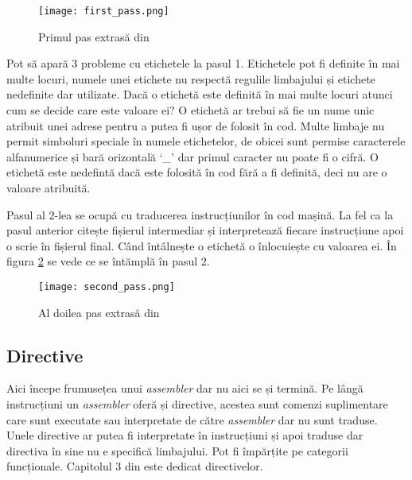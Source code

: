 \documentclass[../main.tex]{subfiles}
\begin{document}
\begin{figure}[h]
    \centering
    \texttt{[image: first\_pass.png]}
    \caption{Primul pas extrasă din \cite{cache}}
    \label{fig:first_pass}
\end{figure}

Pot să apară 3 probleme cu etichetele la pasul 1. Etichetele pot fi definite în mai multe locuri, numele unei etichete
nu respectă regulile limbajului și etichete nedefinite dar utilizate. Dacă o etichetă este definită în mai multe locuri
atunci cum se decide care este valoare ei? O etichetă ar trebui să fie un nume unic atribuit unei adrese pentru a putea
fi ușor de folosit în cod. Multe limbaje nu permit simboluri speciale în numele etichetelor, de obicei sunt permise
caracterele alfanumerice și bară orizontală `\_' dar primul caracter nu poate fi o cifră. O etichetă este nedefintă dacă
este folosită în cod fără a fi definită, deci nu are o valoare atribuită.

Pasul al 2-lea se ocupă cu traducerea instrucțiunilor în cod mașină. La fel ca la pasul anterior citește
fișierul intermediar și interpretează fiecare instrucțiune apoi o scrie în fișierul final. Când întâlnește
o etichetă o înlocuiește cu valoarea ei. În figura \ref{fig:second_pass} se vede ce se întămplă în pasul 2.

\begin{figure}[h]
    \centering
    \texttt{[image: second\_pass.png]}
    \caption{Al doilea pas extrasă din \cite{asl}}
    \label{fig:second_pass}
\end{figure}

\clearpage
\subsection{Directive}
Aici începe frumusețea unui \emph{assembler} dar nu aici se și termină. Pe lângă instrucțiuni un \emph{assembler} oferă
și directive, acestea sunt comenzi suplimentare care sunt executate sau interpretate de către \emph{assembler} dar nu 
sunt traduse. Unele directive ar putea fi interpretate în instrucțiuni și apoi traduse dar directiva în sine nu e
specifică limbajului. Pot fi împărțite pe categorii funcționale. Capitolul 3 din \cite{asl} este dedicat directivelor.
\end{document}
